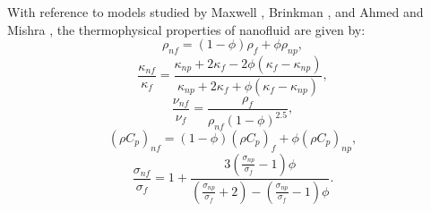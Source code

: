 \documentclass[10pt]{NSP1}
\begin{document}
	With reference to models studied by Maxwell \cite{Maxwell1873}, Brinkman \cite{Brinkman1952}, and Ahmed and Mishra \cite{AhmedMishra2026}, the thermophysical properties of nanofluid are given by:
	\begin{equation}
		\rho_{nf} = (1 - \phi)\rho_{f} + \phi\rho_{np},
	\end{equation}
	\begin{equation}
		\frac{\kappa_{nf}}{\kappa_{f}} = \frac{\kappa_{np} + 2\kappa_{f} - 2\phi(\kappa_{f} - \kappa_{np})}{\kappa_{np} + 2\kappa_{f} + \phi(\kappa_{f} - \kappa_{np})},
	\end{equation}
	\begin{equation}
		\frac{\nu_{nf}}{\nu_{f}} = \frac{\rho_{f}}{\rho_{nf}(1 - \phi)^{2.5}},
	\end{equation}
	\begin{equation}
		\left( \rho C_{p} \right)_{nf} = (1 - \phi)\left( \rho C_{p} \right)_{f} + \phi\left( \rho C_{p} \right)_{np},
	\end{equation}
	\begin{equation}\label{eq:sigma}
		\frac{\sigma_{nf}}{\sigma_{f}} = 1 + \frac{3\left( \frac{\sigma_{np}}{\sigma_{f}} - 1 \right)\phi}{\left( \frac{\sigma_{np}}{\sigma_{f}} + 2 \right) - \left( \frac{\sigma_{np}}{\sigma_{f}} - 1 \right)\phi}.
	\end{equation}
	\newpage
\end{document}
